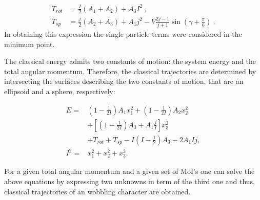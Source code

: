 \documentclass[twocolumn,article,amsmath,amssymb,floatfix,aps]{revtex4}
\begin{document}
\begin{align}
    T_{rot}&=\frac{I}{2}(A_1+A_2)+A_3I^2\ ,\\
    T_{sp}&=\frac{j}{2}(A_2+A_3)+A_1j^2-V\frac{2j-1}{j+1}\sin\left(\gamma+\frac{\pi}{6}\right)\ . 
\end{align}
In obtaining this expression the single particle terms were considered in the minimum point. 

The classical energy admits two constants of motion: the system energy and the total angular momentum.  Therefore, the classical trajectories are determined by intersecting the surfaces describing the two constants of motion, that are an ellipsoid and a sphere, respectively:

\begin{align}   
    E=&\left(1-\frac{1}{2I}\right)A_1x_1^2+\left(1-\frac{1}{2I}\right)A_2x_2^2\nonumber \\
      &+\left[\left(1-\frac{1}{2I}\right)A_3+A_1\frac{j}{I}\right]x_3^2 \nonumber \\
      &+T_{rot}+T_{sp}-I\left(I-\frac{1}{2}\right)A_3-2A_1Ij, \label{ellipsoid_rotation}\nonumber \\
  I^2=&x_1^2+x_2^2+x_3^3. 
\end{align}

 For a given total angular momentum and a given set of MoI's one can solve the above equations by expressing two unknowns in term of the third one and thus, classical trajectories of an wobbling character are obtained. 
\end{document}
